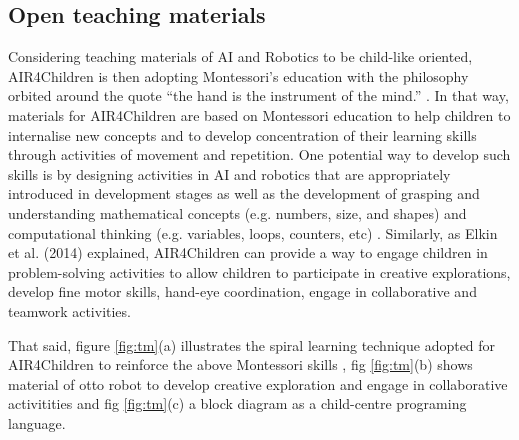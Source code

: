 \documentclass[sigconf]{acmart}
\begin{document}
\subsection{Open teaching materials}
Considering teaching materials of AI and Robotics to be child-like oriented, AIR4Children is then adopting Montessori's education with the philosophy orbited around the quote “the hand is the instrument of the mind.” \cite{montessori2013absorbent}.
In that way, materials for AIR4Children are based on Montessori education to help children to internalise new concepts and to develop concentration of their learning skills through activities of movement and repetition.
One potential way to develop such skills is by designing activities in AI and robotics that are appropriately introduced in development stages \cite{bers2008, bers-horn2010, kazakoff-bers2012} as well as the development of grasping and understanding mathematical concepts (e.g. numbers, size, and shapes) and computational thinking (e.g. variables, loops, counters, etc) \cite{bers2012, resnick1998}.
Similarly, as Elkin et al. (2014) \cite{elkin2014} explained, AIR4Children can provide a way to engage children in problem-solving activities to allow children to participate in creative explorations, develop fine motor skills, hand-eye coordination, engage in collaborative and teamwork activities.

That said, figure \ref{fig:tm}(a) illustrates the spiral learning technique adopted for AIR4Children to reinforce the above Montessori skills \cite{tarik2017}, fig \ref{fig:tm}(b) shows material of otto robot to develop creative exploration and engage in collaborative activitities and fig \ref{fig:tm}(c) a block diagram as a child-centre programing language. 
\end{document}
